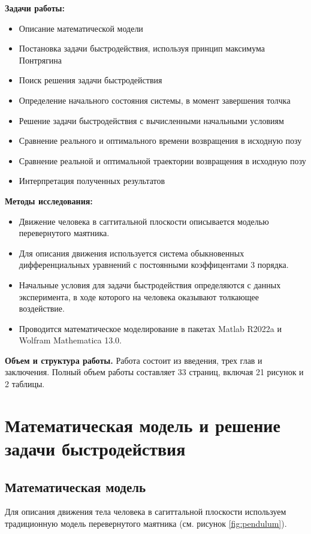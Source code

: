 \documentclass[a4paper,12pt, openany]{book}
\theoremstyle{plain} %
\theoremstyle{definition} %
\theoremstyle{remark} %
\numberwithin{equation}{chapter}
\begin{document}
{\textbf{Задачи работы: }
\begin{itemize}
    \item Описание математической модели
    \item Постановка задачи быстродействия, используя принцип максимума Понтрягина
    \item Поиск решения задачи быстродействия
    \item Определение начального состояния системы, в момент завершения толчка
    \item Решение задачи быстродействия с вычисленными начальными условиям
    \item Сравнение реального и оптимального времени возвращения в исходную позу
    \item Сравнение реальной и оптимальной траектории возвращения в исходную позу
    \item Интерпретация полученных результатов
\end{itemize}

\textbf{Методы исследования:}
\begin{itemize}
    \item Движение человека в саггитальной плоскости описывается моделью перевернутого маятника.
    \item Для описания движения используется система обыкновенных дифференциальных уравнений с постоянными коэффицентами 3 порядка.
    \item Начальные условия для задачи быстродействия определяются с данных эксперимента, в ходе которого на человека оказывают толкающее воздействие.
    \item Проводится математическое моделирование в пакетах Matlab R2022a и Wolfram Mathematica 13.0.
\end{itemize}




\textbf{Объем и структура работы.} Работа состоит из введения, трех глав и заключения. Полный объем работы составляет
33 страниц, включая 21 рисунок и 2 таблицы.

\newpage

\chapter{Математическая модель и решение задачи быстродействия}
\section{Математическая модель}
Для описания движения тела человека в сагиттальной плоскости используем традиционную модель перевернутого маятника (см. рисунок \ref{fig:pendulum}).

}
\end{document}
